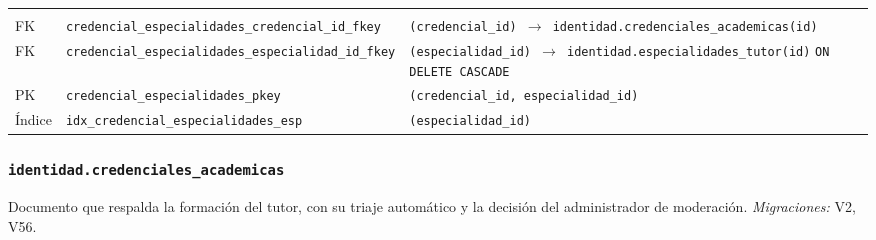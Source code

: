 {\small
\begin{xltabular}{\textwidth}{@{}>{\raggedright\arraybackslash}p{1.7cm} >{\raggedright\arraybackslash}p{4.6cm} L@{}}
    \toprule
     &  &  \\
    \midrule
    \endfirsthead
    \toprule
     &  &  \\
    \midrule
    \endhead
    \bottomrule
    \endfoot
    FK & \texttt{credencial\_\allowbreak{}especialidades\_\allowbreak{}credencial\_\allowbreak{}id\_\allowbreak{}fkey} & \texttt{(\allowbreak{}credencial\_\allowbreak{}id) $\rightarrow$ identidad.credenciales\_\allowbreak{}academicas(\allowbreak{}id)} \\
    FK & \texttt{credencial\_\allowbreak{}especialidades\_\allowbreak{}especialidad\_\allowbreak{}id\_\allowbreak{}fkey} & \texttt{(\allowbreak{}especialidad\_\allowbreak{}id) $\rightarrow$ identidad.especialidades\_\allowbreak{}tutor(\allowbreak{}id)} \texttt{ON DELETE CASCADE} \\
    PK & \texttt{credencial\_\allowbreak{}especialidades\_\allowbreak{}pkey} & \texttt{(\allowbreak{}credencial\_\allowbreak{}id,\allowbreak{} especialidad\_\allowbreak{}id)} \\
    Índice & \texttt{idx\_\allowbreak{}credencial\_\allowbreak{}especialidades\_\allowbreak{}esp} & \texttt{(\allowbreak{}especialidad\_\allowbreak{}id)} \\
\end{xltabular}
}

\subsubsection{\texorpdfstring{\texttt{identidad.credenciales\_\allowbreak{}academicas}}{identidad.credenciales\_academicas}}\label{dd:identidad.credenciales_academicas}

Documento que respalda la formación del tutor, con su triaje automático y la decisión del administrador de moderación. \emph{Migraciones:} V2, V56.

